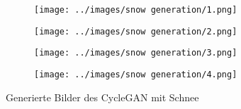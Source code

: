  \begin{figure}[H]
	\centering
  \captionsetup[subfigure]{labelformat=empty}
	\begin{subfigure}[b]{0.15\textwidth}
		 \centering
		 \texttt{[image: ../images/snow generation/1.png]}
	\end{subfigure}
	\hspace{1em}%
	\begin{subfigure}[b]{0.15\textwidth}
		 \centering
		 \texttt{[image: ../images/snow generation/2.png]}
	\end{subfigure}
	\hspace{1em}%
	\begin{subfigure}[b]{0.15\textwidth}
		 \centering
		 \texttt{[image: ../images/snow generation/3.png]}
	\end{subfigure}
	\hspace{1em}%
	\begin{subfigure}[b]{0.15\textwidth}
	 \centering
	 \texttt{[image: ../images/snow generation/4.png]}
  \end{subfigure}
 \caption{Generierte Bilder des \ac{CycleGAN} mit Schnee}
 \label{fig:snow-imgs}
 \end{figure}
